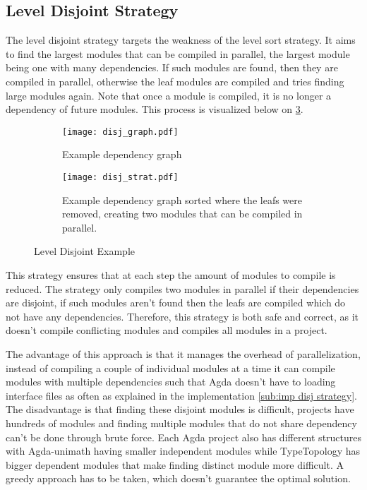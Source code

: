\pagebreak
\subsection{Level Disjoint Strategy} \label{sub:design disjoint strategy}

The level disjoint strategy targets the weakness of the level sort strategy. It
aims to find the largest modules that can be compiled in parallel, the largest
module being one with many dependencies. If such modules are found, then they
are compiled in parallel, otherwise the leaf modules are compiled and tries
finding large modules again. Note that once a module is compiled, it is no
longer a dependency of future modules. This process is visualized below on
\cref{subfig:disj strat}.
\begin{figure}[H]
  \begin{subfigure}[t]{0.5\textwidth}
    \centering
    \texttt{[image: disj\_graph.pdf]}
    \caption{Example dependency graph}
    \label{fig:example disj dep graph}
  \end{subfigure} \hfill
  \begin{subfigure}[t]{0.40\textwidth}
    \centering
    \texttt{[image: disj\_strat.pdf]}
    \caption{Example dependency graph sorted where the leafs were removed,
    creating two modules that can be compiled in parallel. }
    \label{fig:example disj strat}
  \end{subfigure}
  \caption{Level Disjoint Example}
  \label{subfig:disj strat}
\end{figure}

This strategy ensures that at each step the amount of modules to compile is
reduced. The strategy only compiles two modules in parallel if their
dependencies are disjoint, if such modules aren't found then the leafs are
compiled which do not have any dependencies. Therefore, this strategy is both
safe and correct, as it doesn't compile conflicting modules and compiles all
modules in a project.

The advantage of this approach is that it manages the overhead of
parallelization, instead of compiling a couple of individual modules at a time
it can compile modules with multiple dependencies such that Agda doesn't have
to loading interface files as often as explained in the implementation
\cref{sub:imp disj strategy}. The disadvantage is that finding these disjoint
modules is difficult, projects  have hundreds of modules and finding multiple
modules that do not share dependency can't be done through brute force. Each
Agda project also has different structures with Agda-unimath
\cite{agda-unimath} having smaller independent modules while TypeTopology
\cite{type-topology} has bigger dependent modules that make finding distinct
module more difficult. A greedy approach has to be taken, which doesn't
guarantee the optimal solution.

